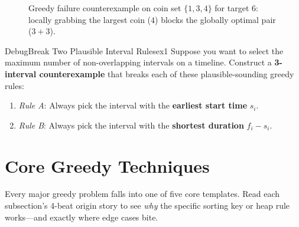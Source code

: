 \documentclass[11pt,a4paper]{article}
\theoremstyle{definition}
\begin{document}
\begin{figure}[htbp]
\caption{Greedy failure counterexample on coin set $\{1, 3, 4\}$ for target $6$: locally grabbing the largest coin ($4$) blocks the globally optimal pair ($3 + 3$).}
\label{fig:greedy_failure}
\end{figure}

\begin{tryitbox}{Debug}{Break Two Plausible Interval Rules}{ex1}
Suppose you want to select the maximum number of non-overlapping intervals on a timeline. Construct a \textbf{3-interval counterexample} that breaks each of these plausible-sounding greedy rules:
\begin{enumerate}[itemsep=1pt, topsep=2pt]
    \item \emph{Rule A}: Always pick the interval with the \textbf{earliest start time} $s_i$.
    \item \emph{Rule B}: Always pick the interval with the \textbf{shortest duration} $f_i - s_i$.
\end{enumerate}
\end{tryitbox}

\section{Core Greedy Techniques}

Every major greedy problem falls into one of five core templates. Read each subsection's 4-beat origin story to see \emph{why} the specific sorting key or heap rule works---and exactly where edge cases bite.
\end{document}
